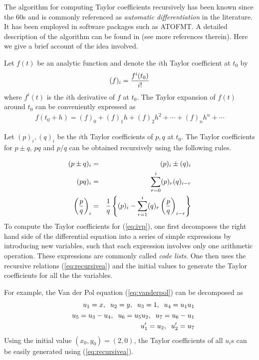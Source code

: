 \documentclass[10pt]{article}
\theoremstyle{remark}
\begin{document}
The algorithm for computing Taylor coefficients recursively has been
known since the 60s and is commonly referenced as {\it automatic
  differentiation} in the literature. It has been employed in software
packages such as ATOFMT.  A detailed description of the algorithm can
be found in \cite{JZ} (see more references therein).  Here we give a
brief account of the idea involved.


Let $f(t)$ be an analytic function and denote the $i$th Taylor
coefficient at $t_0$ by
\begin{eqnarray*}
(f)_i = {{f^{i}(t_0)} \over {i!}}
\end{eqnarray*}
where $f^{i}(t)$ is the $i$th derivative of $f$ at $t_0$. 
The Taylor expansion of $f(t)$ around $t_0$ can be
conveniently expressed as
\begin{eqnarray*}
f(t_0 +h) = (f)_0 + (f)_1 h + (f)_2 h^2 + \cdots + (f)_n h^n + \cdots
\end{eqnarray*}

Let $(p)_i, (q)_i$ be the $i$th Taylor coefficients of $p, q$ at
$t_0$. The Taylor coefficients for $p\pm q$, $pq$ and $p/q$ can be
obtained recursively using the following rules.

\begin{eqnarray}
\label{eq:recursivea}
(p\pm q)_i &=& (p)_i \pm (q)_i \cr
(p q)_i &=& \sum_{r=0}^{i} (p)_r (q)_{i-r} \cr
\left({p\over q}\right)_i &=& {1\over q}\left\{ 
(p)_i - \sum_{r=1}^{i} (q)_r \left({p\over q}\right)_{i-r}\right\} 
\end{eqnarray}
To compute the Taylor coefficients for (\ref{eq:ivp}), one first
decomposes the right hand side of the differential equation into a
series of simple expressions by introducing new variables, such that
each expression involves only one arithmetic operation. These
expressions are commonly called {\it code lists}. One then uses the
recursive relations (\ref{eq:recursivea}) and the initial values to
generate the Taylor coefficients for all the the variables.

For example, the Van der Pol equation (\ref{eq:vanderpol}) can be
decomposed as
\begin{eqnarray*}
& & u_1 = x,\;\;  u_2 = y,\;\; u_3 = 1,\;\; u_4= u_1 u_1\cr
& & u_5 = u_3-u_4,\;\; u_6 = u_5 u_2,\;\; u_7= u_6-u_1\cr
& & u_1' = u_2, \;\; u_2'= u_7
\end{eqnarray*}
Using the initial value $(x_0, y_0)=(2, 0)$, the Taylor coefficients
of all $u_i$s can be easily generated using (\ref{eq:recursivea}).
\end{document}
